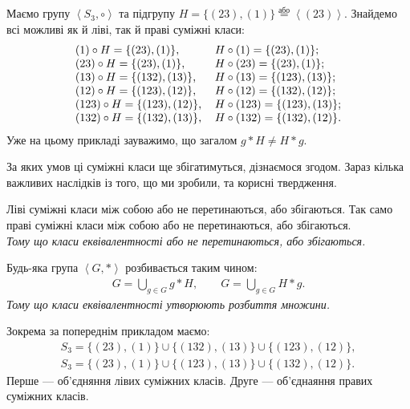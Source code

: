 \documentclass{math_library}
\begin{document}
\begin{example}
Маємо групу $\left<S_3, \circ \right>$ та підгрупу $H = \{ (23), (1) \} \overset{\text{або}}{=} \left<(23)\right>$. Знайдемо всі можливі як й ліві, так й праві суміжні класи:
\begin{align*}
\begin{tabular}{ll}
$(1) \circ H = \{(23),(1)\}$, & $H \circ (1) = \{(23),(1)\}$;\\
$(23) \circ H = \{(23),(1)\}$, & $H \circ (23) = \{(23),(1)\}$;\\
$(13) \circ H = \{(132),(13)\}$, & $H \circ (13)  = \{(123),(13)\}$;\\
$(12) \circ H = \{(123),(12)\}$, & $H \circ (12)  = \{(132),(12)\}$;\\
$(123) \circ H = \{(123),(12)\}$, & $H \circ (123) = \{(123),(13)\}$;\\
$(132) \circ H = \{(132),(13)\}$, & $H \circ (132) = \{(132),(12)\}$.\\
\end{tabular}
\end{align*}
Уже на цьому прикладі зауважимо, що загалом $g * H \neq H* g$.
\end{example}

За яких умов ці суміжні класи ще збігатимуться, дізнаємося згодом. Зараз кілька важливих наслідків із того, що ми зробили, та корисні твердження.

\begin{corollary}
Ліві суміжні класи між собою або не перетинаються, або збігаються. Так само праві суміжні класи між собою або не перетинаються, або збігаються.\\
\textit{Тому що класи еквівалентності або не перетинаються, або збігаються.}
\end{corollary}

\begin{corollary}
Будь-яка група $\left<G,*\right>$ розбивається таким чином:
\begin{align*}
G = \displaystyle\bigcup_{g \in G} g*H, \qquad G = \displaystyle\bigcup_{g \in G} H*g.
\end{align*}
\textit{Тому що класи еквівалентності утворюють розбиття множини.}
\end{corollary}

\begin{example}
Зокрема за попереднім прикладом маємо:
\begin{align*}
S_3 = \{(23), (1)\} \cup \{(132), (13)\} \cup \{(123), (12)\}, \\
S_3 = \{(23), (1)\} \cup \{(123), (13)\} \cup \{(132), (12)\}.
\end{align*}
Перше --- об'єдняння лівих суміжних класів. Друге --- об'єднаяння правих суміжних класів.
\end{example}
\end{document}
